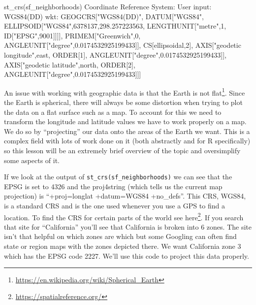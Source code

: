 \documentclass[
]{krantz}
\makeatletter
\newenvironment{Shaded}{\begin{snugshade}}{\end{snugshade}}
\newcommand{\DecValTok}[1]{\textcolor[rgb]{0.06,0.06,0.06}{#1}}
\newcommand{\FloatTok}[1]{\textcolor[rgb]{0.06,0.06,0.06}{#1}}
\newcommand{\FunctionTok}[1]{\textcolor[rgb]{0,0,0}{#1}}
\newcommand{\NormalTok}[1]{#1}
\newcommand{\SpecialCharTok}[1]{\textcolor[rgb]{0,0,0}{#1}}
\newcommand{\StringTok}[1]{\textcolor[rgb]{0.5,0.5,0.5}{#1}}
\renewcommand{\href}[2]{#2\footnote{\url{#1}}}
\newenvironment{kframe}{%
\medskip{}
\setlength{\fboxsep}{.8em}
 \def\at@end@of@kframe{}%
 \ifinner\ifhmode%
  \def\at@end@of@kframe{\end{minipage}}%
  \begin{minipage}{\columnwidth}%
 \fi\fi%
 \def\FrameCommand##1{\hskip\@totalleftmargin \hskip-\fboxsep
 \colorbox{shadecolor}{##1}\hskip-\fboxsep
     \hskip-\linewidth \hskip-\@totalleftmargin \hskip\columnwidth}%
 \MakeFramed {\advance\hsize-\width
   \@totalleftmargin\z@ \linewidth\hsize
   \@setminipage}}%
 {\par\unskip\endMakeFramed%
 \at@end@of@kframe}
\renewenvironment{Shaded}{\begin{kframe}}{\end{kframe}}
\makeatother
\begin{document}
\begin{Shaded}
\begin{Highlighting}[]
\FunctionTok{st\_crs}\NormalTok{(sf\_neighborhoods)}
\NormalTok{Coordinate Reference System}\SpecialCharTok{:}
\NormalTok{  User input}\SpecialCharTok{:} \FunctionTok{WGS84}\NormalTok{(DD) }
\NormalTok{  wkt}\SpecialCharTok{:}
\NormalTok{GEOGCRS[}\StringTok{"WGS84(DD)"}\NormalTok{,}
\NormalTok{    DATUM[}\StringTok{"WGS84"}\NormalTok{,}
\NormalTok{        ELLIPSOID[}\StringTok{"WGS84"}\NormalTok{,}\DecValTok{6378137}\NormalTok{,}\FloatTok{298.257223563}\NormalTok{,}
\NormalTok{            LENGTHUNIT[}\StringTok{"metre"}\NormalTok{,}\DecValTok{1}\NormalTok{,}
\NormalTok{                ID[}\StringTok{"EPSG"}\NormalTok{,}\DecValTok{9001}\NormalTok{]]]],}
\NormalTok{    PRIMEM[}\StringTok{"Greenwich"}\NormalTok{,}\DecValTok{0}\NormalTok{,}
\NormalTok{        ANGLEUNIT[}\StringTok{"degree"}\NormalTok{,}\FloatTok{0.0174532925199433}\NormalTok{]],}
\NormalTok{    CS[ellipsoidal,}\DecValTok{2}\NormalTok{],}
\NormalTok{        AXIS[}\StringTok{"geodetic longitude"}\NormalTok{,east,}
\NormalTok{            ORDER[}\DecValTok{1}\NormalTok{],}
\NormalTok{            ANGLEUNIT[}\StringTok{"degree"}\NormalTok{,}\FloatTok{0.0174532925199433}\NormalTok{]],}
\NormalTok{        AXIS[}\StringTok{"geodetic latitude"}\NormalTok{,north,}
\NormalTok{            ORDER[}\DecValTok{2}\NormalTok{],}
\NormalTok{            ANGLEUNIT[}\StringTok{"degree"}\NormalTok{,}\FloatTok{0.0174532925199433}\NormalTok{]]]}
\end{Highlighting}
\end{Shaded}

An issue with working with geographic data is that \href{https://en.wikipedia.org/wiki/Spherical_Earth}{the Earth is not flat}. Since the Earth is spherical, there will always be some distortion when trying to plot the data on a flat surface such as a map. To account for this we need to transform the longitude and latitude values we have to work properly on a map. We do so by ``projecting'' our data onto the areas of the Earth we want. This is a complex field with lots of work done on it (both abstractly and for R specifically) so this lesson will be an extremely brief overview of the topic and oversimplify some aspects of it.

If we look at the output of \texttt{st\_crs(sf\_neighborhoods)} we can see that the EPSG is set to 4326 and the proj4string (which tells us the current map projection) is ``+proj=longlat +datum=WGS84 +no\_defs''. This CRS, WGS84, is a standard CRS and is the one used whenever you use a GPS to find a location. To find the CRS for certain parts of the world see \href{https://spatialreference.org/}{here}. If you search that site for ``California'' you'll see that California is broken into 6 zones. The site isn't that helpful on which zones are which but some Googling can often find state or region maps with the zones depicted there. We want California zone 3 which has the EPSG code 2227. We'll use this code to project this data properly.
\end{document}
